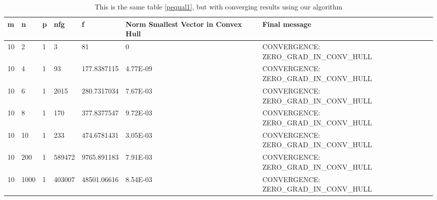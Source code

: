 \begin{center}
  \begin{table}
    \label{p1table}
    \begin{tabular}{|l|l|l|l|l|p{3.5cm}|p{6cm}|}
      \hline
       m & n & p & nfg & f & Norm Smallest Vector in Convex Hull & Final message \\ \hline
       10 & 2 & 1 & 3 & 81 & 0 & CONVERGENCE: ZERO\_GRAD\_IN\_CONV\_HULL \\
       10 & 4 & 1 & 93 & 177.8387115 & 4.77E-09 & CONVERGENCE: ZERO\_GRAD\_IN\_CONV\_HULL \\
       10 & 6 & 1 & 2015 & 280.7317034 & 7.67E-03 & CONVERGENCE: ZERO\_GRAD\_IN\_CONV\_HULL \\
       10 & 8 & 1 & 170 & 377.8377547 & 9.72E-03 & CONVERGENCE: ZERO\_GRAD\_IN\_CONV\_HULL \\
       10 & 10 & 1 & 233 & 474.6781431 & 3.05E-03 & CONVERGENCE: ZERO\_GRAD\_IN\_CONV\_HULL \\
       10 & 200 & 1 & 589472 & 9765.891183 & 7.91E-03 & CONVERGENCE: ZERO\_GRAD\_IN\_CONV\_HULL \\
       10 & 1000 & 1 & 403007 & 48501.06616 & 8.54E-03 & CONVERGENCE: ZERO\_GRAD\_IN\_CONV\_HULL \\ \hline
    \end{tabular}
    \caption[Converging runs for $p = 1$]{This is the same table \ref{pequal1}, but with converging results using our algorithm}
  \end{table}
\end{center}
